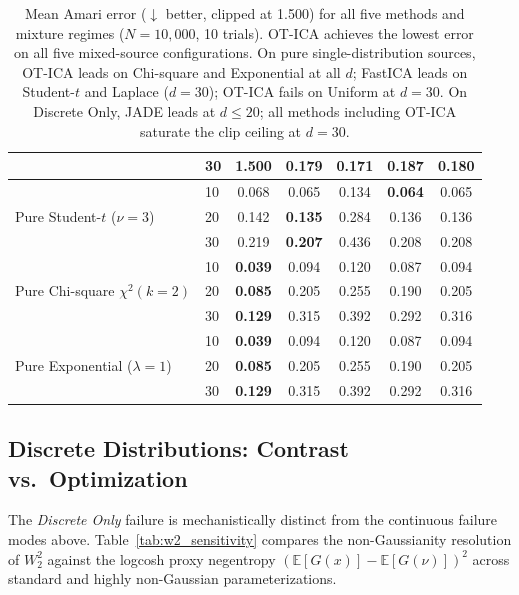\documentclass[accepted]{tpm2026} %
\begin{document}
\begin{table}[htbp]
\begin{tabular}{llccccc}
 & 30 & 1.500 & 0.179 & \textbf{0.171} & 0.187 & 0.180 \\
\midrule
\multirow{3}{*}{Pure Student-$t$ ($\nu=3$)}
 & 10 & 0.068 & 0.065 & 0.134 & \textbf{0.064} & 0.065 \\
 & 20 & 0.142 & \textbf{0.135} & 0.284 & 0.136 & 0.136 \\
 & 30 & 0.219 & \textbf{0.207} & 0.436 & 0.208 & 0.208 \\
\midrule
\multirow{3}{*}{Pure Chi-square $\chi^2(k=2)$}
 & 10 & \textbf{0.039} & 0.094 & 0.120 & 0.087 & 0.094 \\
 & 20 & \textbf{0.085} & 0.205 & 0.255 & 0.190 & 0.205 \\
 & 30 & \textbf{0.129} & 0.315 & 0.392 & 0.292 & 0.316 \\
\midrule
\multirow{3}{*}{Pure Exponential ($\lambda=1$)}
 & 10 & \textbf{0.039} & 0.094 & 0.120 & 0.087 & 0.094 \\
 & 20 & \textbf{0.085} & 0.205 & 0.255 & 0.190 & 0.205 \\
 & 30 & \textbf{0.129} & 0.315 & 0.392 & 0.292 & 0.316 \\
\bottomrule
\end{tabular}
\caption{Mean Amari error ($\downarrow$ better, clipped at 1.500) for all five methods and mixture regimes ($N=10{,}000$, 10 trials). OT-ICA achieves the lowest error on all five mixed-source configurations. On pure single-distribution sources, OT-ICA leads on Chi-square and Exponential at all $d$; FastICA leads on Student-$t$ and Laplace ($d=30$); OT-ICA fails on Uniform at $d=30$. On Discrete Only, JADE leads at $d \le 20$; all methods including OT-ICA saturate the clip ceiling at $d=30$.}
\label{tab:full_amari_results}
\end{table}

\subsection{Discrete Distributions: Contrast vs.\ Optimization}
\label{app:discrete_contrast}
The \textit{Discrete Only} failure is mechanistically distinct from the continuous failure modes above. Table~\ref{tab:w2_sensitivity} compares
the non-Gaussianity resolution of $W_2^2$ against the logcosh proxy negentropy $(\mathbb{E}[G(x)]-\mathbb{E}[G(\nu)])^2$ across standard and highly non-Gaussian parameterizations.
\end{document}

